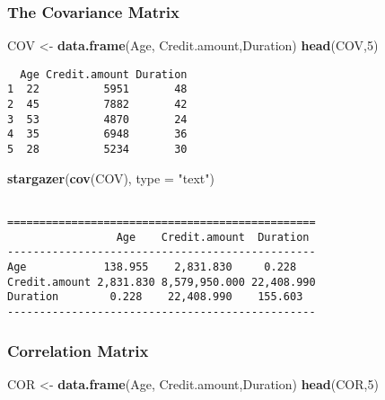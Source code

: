 \documentclass[
]{article}
\newenvironment{Shaded}{\begin{snugshade}}{\end{snugshade}}
\newcommand{\AttributeTok}[1]{\textcolor[rgb]{0.13,0.29,0.53}{#1}}
\newcommand{\DecValTok}[1]{\textcolor[rgb]{0.00,0.00,0.81}{#1}}
\newcommand{\FunctionTok}[1]{\textcolor[rgb]{0.13,0.29,0.53}{\textbf{#1}}}
\newcommand{\NormalTok}[1]{#1}
\newcommand{\OtherTok}[1]{\textcolor[rgb]{0.56,0.35,0.01}{#1}}
\newcommand{\StringTok}[1]{\textcolor[rgb]{0.31,0.60,0.02}{#1}}
\begin{document}
\hypertarget{the-covariance-matrix}{%
\subsubsection{The Covariance Matrix}\label{the-covariance-matrix}}

\begin{Shaded}
\begin{Highlighting}[]
\NormalTok{COV }\OtherTok{\textless{}{-}} \FunctionTok{data.frame}\NormalTok{(Age, Credit.amount,Duration)}
\FunctionTok{head}\NormalTok{(COV,}\DecValTok{5}\NormalTok{)}
\end{Highlighting}
\end{Shaded}

\begin{verbatim}
  Age Credit.amount Duration
1  22          5951       48
2  45          7882       42
3  53          4870       24
4  35          6948       36
5  28          5234       30
\end{verbatim}

\begin{Shaded}
\begin{Highlighting}[]
\FunctionTok{stargazer}\NormalTok{(}\FunctionTok{cov}\NormalTok{(COV), }\AttributeTok{type =} \StringTok{"text"}\NormalTok{)}
\end{Highlighting}
\end{Shaded}

\begin{verbatim}

================================================
                 Age    Credit.amount  Duration 
------------------------------------------------
Age            138.955    2,831.830     0.228   
Credit.amount 2,831.830 8,579,950.000 22,408.990
Duration        0.228    22,408.990    155.603  
------------------------------------------------
\end{verbatim}

\hypertarget{correlation-matrix}{%
\subsubsection{Correlation Matrix}\label{correlation-matrix}}

\begin{Shaded}
\begin{Highlighting}[]
\NormalTok{COR }\OtherTok{\textless{}{-}} \FunctionTok{data.frame}\NormalTok{(Age, Credit.amount,Duration)}
\FunctionTok{head}\NormalTok{(COR,}\DecValTok{5}\NormalTok{)}
\end{Highlighting}
\end{Shaded}
\end{document}
